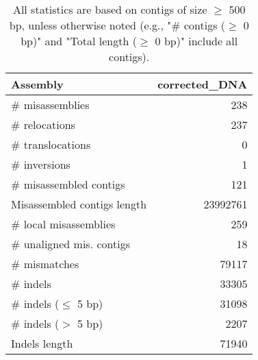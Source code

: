 \documentclass[12pt,a4paper]{article}
\begin{document}
\begin{table}[ht]
\begin{center}
\caption{All statistics are based on contigs of size $\geq$ 500 bp, unless otherwise noted (e.g., "\# contigs ($\geq$ 0 bp)" and "Total length ($\geq$ 0 bp)" include all contigs).}
\begin{tabular}{|l*{1}{|r}|}
\hline
Assembly & corrected\_DNA \\ \hline
\# misassemblies & 238 \\ \hline
\hspace{5mm}\# relocations & 237 \\ \hline
\hspace{5mm}\# translocations & 0 \\ \hline
\hspace{5mm}\# inversions & 1 \\ \hline
\# misassembled contigs & 121 \\ \hline
Misassembled contigs length & 23992761 \\ \hline
\# local misassemblies & 259 \\ \hline
\# unaligned mis. contigs & 18 \\ \hline
\# mismatches & 79117 \\ \hline
\# indels & 33305 \\ \hline
\hspace{5mm}\# indels ($\leq$ 5 bp) & 31098 \\ \hline
\hspace{5mm}\# indels ($>$ 5 bp) & 2207 \\ \hline
Indels length & 71940 \\ \hline
\end{tabular}
\end{center}
\end{table}
\end{document}
